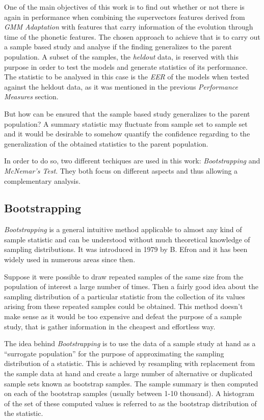One of the main objectives of this work is to find out whether or not there is again in performance
when combining the supervectors features derived from \textit{GMM Adaptation} with features
that carry information of the evolution through time of the phonetic features.
The chosen approach to achieve that is to carry out a sample based study and analyse if the
finding generalizes to the parent population. A subset of the samples, the \textit{heldout} data,
is reserved with this purpose in order to test the models and generate statistics of its
performance. The statistic to be analysed in this case
is the \textit{EER} of the models
when tested against the heldout data, as it was mentioned in the previous \textit{Performance
Measures} section.

But how can be ensured that the sample based study generalizes to the parent population?
A summary statistic may fluctuate from sample set to sample set and it would be
desirable to somehow quantify the confidence regarding to the generalization of the
obtained statistics to the parent population.

In order to do so, two different techiques are used in this work: \textit{Bootstrapping} and \\
\textit{McNemar's Test}. They both focus on different aspects and thus allowing a
complementary analysis.

\subsection{Bootstrapping}

\cite{bootstrapping} \textit{Bootstrapping} is a general intuitive method applicable
to almost any kind of sample statistic and can be understood without much theoretical
knowledge of sampling distributions. It was introduced in 1979 by B. Efron and it has
been widely used in numerous areas since then.

Suppose it were possible to draw repeated samples
of the same size from the population of interest a large number of times. Then
a fairly good idea about the sampling distribution of a particular statistic from
the collection of its values arising from these repeated samples could be obtained.
This method doesn't make sense as it would be too expensive and defeat the purpose of a
sample study, that is gather information in the cheapest and effortless way.

The idea behind \textit{Bootstrapping} is to use the data of a sample study at hand as a
``surrogate population'' for the purpose of approximating the sampling distribution of
a statistic. This is achieved by resampling with replacement from the sample data
at hand and create a large number of alternative or duplicated sample sets known as
bootstrap samples. The sample summary is then computed on each of the bootstrap
samples (usually between 1-10 thousand). A histogram of the set of these computed
values is referred to as the bootstrap distribution of the statistic.


